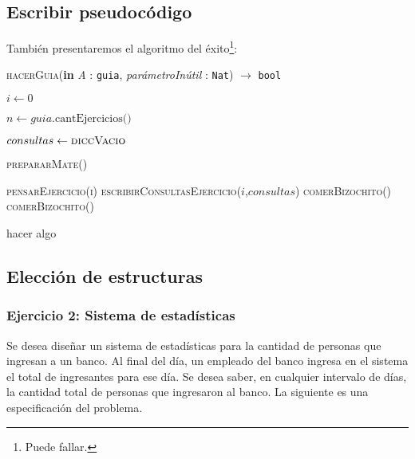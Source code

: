 \documentclass[10pt, a4paper]{article}
\newcommand{\bigO}{\mathcal{O}}
\begin{document}
\subsection{Escribir pseudoc\'odigo}
Tambi\'en presentaremos el algoritmo del \'exito\footnote{Puede fallar. }:

\newcommand{\asignar}[2]{$#1 \gets #2$}

\begin{algorithm}[H]
    \caption{\textsc{hacerGuia}(\textbf{in} \textit{A} : \texttt{guia}, \textit{parámetroInútil} : \texttt{Nat}) $\longrightarrow$ \texttt{bool}}
    \begin{algorithmic}[1]
      \State \asignar{i}{0} 

      \State \asignar{n}{guia.\text{cantEjercicios()}} \Comment{$\bigO$(1)}

     \State \asignar{consultas}{\textsc{diccVacio}}

      \State \textsc{prepararMate()} 

      \State \textsc{pensarEjercicio(i)}
        \State \textsc{escribirConsultasEjercicio($i$,$consultas$)}
      \Else
        \State \textsc{comerBizochito()}
      \EndIf
        \State \textsc{comerBizochito()}
      \EndWhile

           \State hacer algo
      \EndFor

      \State {}
    \end{algorithmic}
  \end{algorithm}


\subsection{Elección de estructuras}

\subsubsection*{Ejercicio 2: Sistema de estadísticas}

Se desea diseñar un sistema de estadísticas para la cantidad de personas
que ingresan a un banco. Al final del día, un empleado del banco ingresa en
el sistema el total de ingresantes para ese día. Se desea saber, en cualquier
intervalo de días, la cantidad total de personas que ingresaron al banco.
La siguiente es una especificación del problema.
\end{document}

